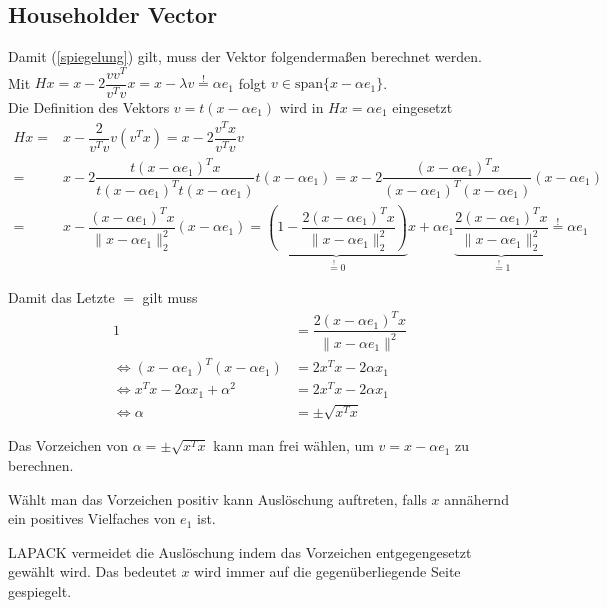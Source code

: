 \subsection{Householder Vector}
Damit (\ref{spiegelung}) gilt, muss der Vektor folgendermaßen berechnet werden. \\
Mit $Hx = x - 2\dfrac{vv^T}{v^Tv} x = x - \lambda v \overset{!}{=} \alpha e_1$ folgt $v \in \text{span}\{x - \alpha e_1\}$. \cite{num1}\\
Die Definition des Vektors $v = t(x - \alpha e_1)$ wird in $Hx = \alpha e_1 $ eingesetzt
\begin{align*}
	Hx =& x - \dfrac{2}{v^Tv}v(v^Tx) = x - 2\dfrac{v^Tx}{v^Tv}v\\
	=& x - 2\dfrac{ t(x - \alpha e_1)^Tx}{ t(x - \alpha e_1)^T t(x - \alpha e_1)} t(x - \alpha e_1)
	= x - 2\dfrac{ (x - \alpha e_1)^Tx}{ (x - \alpha e_1)^T (x - \alpha e_1)} (x - \alpha e_1)
	\\
	=& x - \dfrac{(x - \alpha e_1)^Tx}{\|x - \alpha e_1\|_2^2} (x - \alpha e_1)
	=\underbrace{\left(1 - \dfrac{2(x - \alpha e_1)^Tx}{\|x - \alpha e_1\|_2^2}\right)}_{ \overset{!}{=} 0 } x + \alpha e_1 \underbrace{\dfrac{2(x - \alpha e_1)^Tx}{\|x - \alpha e_1\|_2^2} }_{\overset{!}{=} 1} \overset{!}{=} \alpha e_1
\end{align*}

Damit das Letzte	 $=$ gilt muss 
\begin{align*}
	1 &= \dfrac{2(x - \alpha e_1)^Tx}{\|x - \alpha e_1\|^2}\\
	\Leftrightarrow (x - \alpha e_1)^T(x - \alpha e_1) &= 2 x^T x - 2\alpha x_1 \\
	\Leftrightarrow x^Tx -2\alpha x_1 + \alpha^2 &= 2 x^T x - 2\alpha x_1\\
	\Leftrightarrow \alpha &= \pm \sqrt{x^Tx}
\end{align*}

Das Vorzeichen von  $\alpha = \pm \sqrt{x^Tx}$ kann man frei wählen, um $ v = x - \alpha e_1$ zu berechnen.



Wählt man das Vorzeichen positiv kann Auslöschung auftreten, falls $x$ annähernd ein positives Vielfaches von $e_1$ ist.

LAPACK \cite{DGEQR2} vermeidet die Auslöschung indem das Vorzeichen entgegengesetzt gewählt wird. Das bedeutet $x$ wird immer auf die gegenüberliegende Seite gespiegelt.


